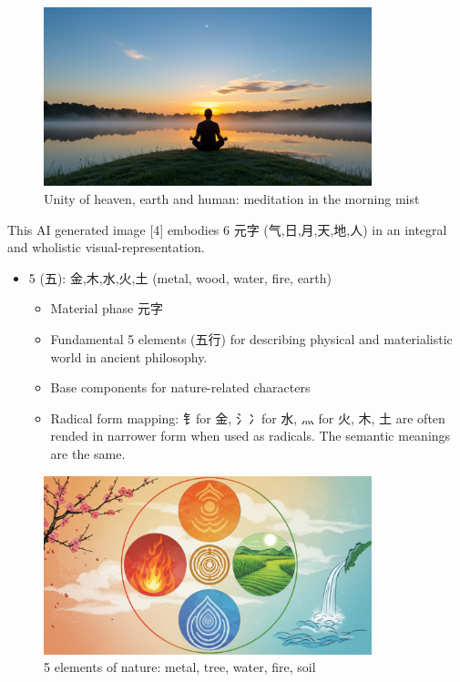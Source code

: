 \documentclass[
  11pt,
  letterpaper,
]{article}
\providecommand{\tightlist}{%
  \setlength{\itemsep}{0pt}\setlength{\parskip}{0pt}}
\begin{document}
\begin{figure}
\centering
\includegraphics[width=0.85\textwidth]{./images/sun-moon-heaven-human-earth-meditation-morning.jpg}
\caption{Unity of heaven, earth and human: meditation in the morning mist}
\end{figure}

This AI generated image {[}4{]} embodies 6 元字 (气,日,月,天,地,人) in
an integral and wholistic visual-representation.

\begin{itemize}
\tightlist
\item
  5 (五): 金,木,水,火,土 (metal, wood, water, fire, earth)

  \begin{itemize}
  \tightlist
  \item
    Material phase 元字
  \item
    Fundamental 5 elements (五行) for describing physical and
    materialistic world in ancient philosophy.
  \item
    Base components for nature-related characters
  \item
    Radical form mapping: 钅for 金, 氵冫for 水, 灬 for 火, 木, 土 are
    often rended in narrower form when used as radicals. The semantic
    meanings are the same.
  \end{itemize}
\end{itemize}

\begin{figure}
\centering
\includegraphics[width=0.85\textwidth]{./images/five-elements.jpg}
\caption{5 elements of nature: metal, tree, water, fire, soil}
\end{figure}
\end{document}

